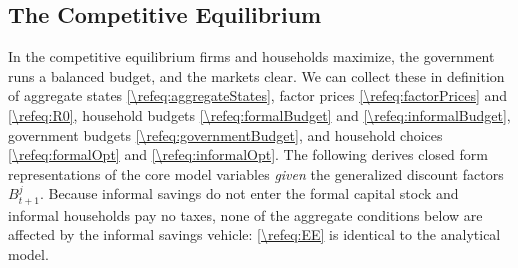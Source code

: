 \documentclass[a4paper]{article}
\begin{document}
\subsection{The Competitive Equilibrium}\label{\refsec:EE}
In the competitive equilibrium firms and households maximize, the government runs a balanced budget, and the markets clear. We can collect these in definition of aggregate states \eqref{\refeq:aggregateStates}, factor prices \eqref{\refeq:factorPrices} and \eqref{\refeq:R0}, household budgets \eqref{\refeq:formalBudget} and \eqref{\refeq:informalBudget}, government budgets \eqref{\refeq:governmentBudget}, and household choices \eqref{\refeq:formalOpt} and \eqref{\refeq:informalOpt}. The following derives closed form representations of the core model variables \emph{given} the generalized discount factors $B_{t+1}^j$. Because informal savings do not enter the formal capital stock and informal households pay no taxes, none of the aggregate conditions below are affected by the informal savings vehicle: \eqref{\refeq:EE} is identical to the analytical model.
\end{document}
